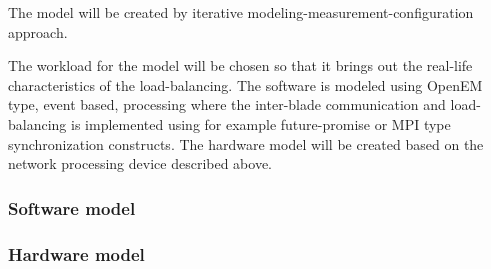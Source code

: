 The model will be created by iterative modeling-measurement-configuration approach.

The workload for the model will be chosen so that it brings out the real-life characteristics of the load-balancing. The software is modeled using OpenEM type, event based, processing where the inter-blade communication and load-balancing is implemented using for example future-promise or MPI type synchronization constructs. The hardware model will be created based on the network processing device described above.

\subsubsection{Software model}

\subsubsection{Hardware model}

